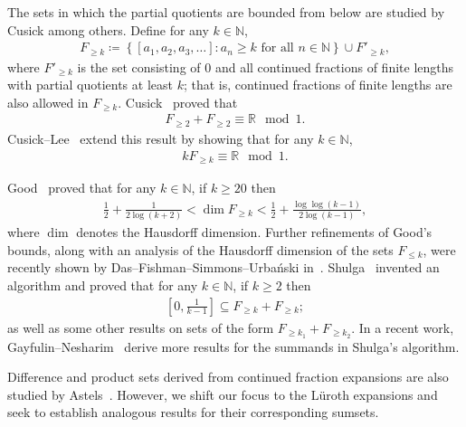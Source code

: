 \documentclass{ws-ijnt}
\begin{document}
	The sets in which the partial quotients are bounded from below are studied by Cusick among others. Define for any $k\in\mathbb{N}$,
	\begin{align*}
		F_{\geq k}
		\coloneqq
		\left\{[a_1,a_2,a_3,\ldots] : a_n \geq k \text{ for all } n\in\mathbb{N}\right\}\cup F'_{\geq k},
	\end{align*}
	where $F'_{\geq k}$ is the set consisting of 0 and all continued fractions of finite lengths with partial quotients at least $k$; that is, continued fractions of finite lengths are also allowed in $F_{\geq k}$. Cusick~\cite[Theorem 1]{cusick1971sums} proved that
	\begin{align*}
		F_{\geq 2}+F_{\geq 2}\equiv\mathbb{R} \mod 1.
	\end{align*}
	Cusick--Lee~\cite{lee1971sums} extend this result by showing that for any $k\in\mathbb{N}$,
	\begin{align}\label{eq: ksk}
		k F_{\geq k} \equiv \mathbb{R} \mod 1.
	\end{align}
	
	Good~\cite[Theorem 2]{Good_1941} proved that for any $k\in\mathbb{N}$, if $k\geq20$ then
	\begin{align*}
		\frac{1}{2}+\frac{1}{2\log{(k+2)}}
		<\dim{F_{\geq k}}
		<\frac{1}{2}+\frac{\log{\log{(k-1)}}}{2\log{(k-1)}},
	\end{align*}
	where $\dim$ denotes the Hausdorff dimension. Further refinements of Good's bounds, along with an analysis of the Hausdorff dimension of the sets $F_{\leq k}$, were recently shown by Das--Fishman--Simmons--Urbański in~\cite{Das_2023}. Shulga~\cite[Theorem 1.2]{Shulga2024CusickCantor} invented an algorithm and proved that for any $k\in\mathbb{N}$, if $k\geq2$ then
	\begin{align*}
		\left[0,\frac{1}{k-1}\right]\subseteq F_{\geq k}+F_{\geq k};
	\end{align*}
	as well as some other results on sets of the form $F_{\geq k_1}+F_{\geq k_2}$. In a recent work, Gayfulin--Nesharim~\cite{gayfulin2025realnumbersumreal} derive more results for the summands in Shulga's algorithm.
	
	Difference and product sets derived from continued fraction expansions are also studied by Astels~\cite{astels2000,astels2001sums,astels2002sums}. However, we shift our focus to the L\"uroth expansions and seek to establish analogous results for their corresponding sumsets.
	
\end{document}
